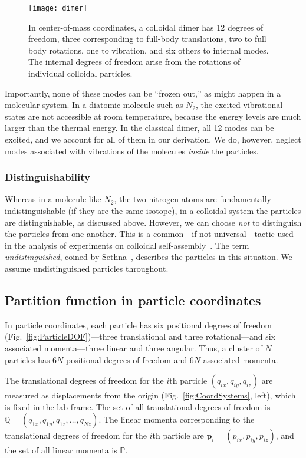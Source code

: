 \documentclass[pre, aps, twocolumn, reprint, amsmath,amssymb, showpacs,
superscriptaddress] {revtex4-1}
\begin{document}
\begin{figure}
\centering
\texttt{[image: dimer]}
\caption{\label{fig:dimer-DOF}In center-of-mass coordinates, a colloidal
  dimer has 12 degrees of freedom, three corresponding to full-body
  translations, two to full body rotations, one to vibration, and six
  others to internal modes. The internal degrees of freedom arise from
  the rotations of individual colloidal particles.}
\end{figure}

Importantly, none of these modes can be ``frozen out,'' as might happen
in a molecular system. In a diatomic molecule such as $N_2$, the excited
vibrational states are not accessible at room temperature, because the
energy levels are much larger than the thermal energy. In the classical
dimer, all 12 modes can be excited, and we account for all of them in
our derivation. We do, however, neglect modes associated with vibrations
of the molecules \emph{inside} the particles.

\subsubsection{Distinguishability}

Whereas in a molecule like $N_2$, the two nitrogen atoms are
fundamentally indistinguishable (if they are the same isotope), in a
colloidal system the particles are distinguishable, as discussed above.
However, we can choose \emph{not} to distinguish the particles from one
another. This is a common---if not universal---tactic used in the
analysis of experiments on colloidal
self-assembly~\cite{cates_celebrating_2015}. The term
\emph{undistinguished}, coined by Sethna~\cite{Sethna_2006}, describes
the particles in this situation. We assume undistinguished particles
throughout.

\subsection{Partition function in particle coordinates}
\label{sec:Q_in_particle_coords}

In particle coordinates, each particle has six positional degrees of
freedom (Fig.~\ref{fig:ParticleDOF})---three translational and three
rotational---and six associated momenta---three linear and three
angular. Thus, a cluster of $N$ particles has $6N$ positional degrees of
freedom and $6N$ associated momenta.

The translational degrees of freedom for the $i$th particle $(q_{ix},
q_{iy}, q_{iz})$ are measured as displacements from the origin
(Fig.~\ref{fig:CoordSystems}, left), which is fixed in the lab frame.
The set of all translational degrees of freedom is $\mathbb{Q} =
(q_{1x}, q_{1y}, q_{1z}, \ldots, q_{Nz})$. The linear momenta
corresponding to the translational degrees of freedom for the $i$th
particle are $\mathbf{p}_i = (p_{ix}, p_{iy}, p_{iz})$, and the set of
all linear momenta is $\mathbb{P}$.
\end{document}
